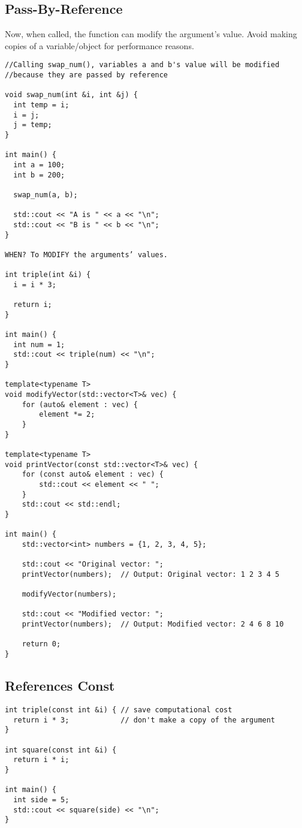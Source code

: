 \documentclass[openany]{report}
\begin{document}
\subsection{Pass-By-Reference}

Now, when called, the function can modify the argument's value.
Avoid making copies of a variable/object for performance reasons.

\begin{verbatim}
//Calling swap_num(), variables a and b's value will be modified
//because they are passed by reference

void swap_num(int &i, int &j) {
  int temp = i;
  i = j;
  j = temp;
}
 
int main() {
  int a = 100;
  int b = 200;
 
  swap_num(a, b);
 
  std::cout << "A is " << a << "\n";
  std::cout << "B is " << b << "\n";
}

WHEN? To MODIFY the arguments’ values.

int triple(int &i) {
  i = i * 3;
  
  return i;
}

int main() {
  int num = 1;
  std::cout << triple(num) << "\n";
}

template<typename T>
void modifyVector(std::vector<T>& vec) {
    for (auto& element : vec) {
        element *= 2;
    }
}

template<typename T>
void printVector(const std::vector<T>& vec) {
    for (const auto& element : vec) {
        std::cout << element << " ";
    }
    std::cout << std::endl;
}

int main() {
    std::vector<int> numbers = {1, 2, 3, 4, 5};

    std::cout << "Original vector: ";
    printVector(numbers);  // Output: Original vector: 1 2 3 4 5

    modifyVector(numbers);

    std::cout << "Modified vector: ";
    printVector(numbers);  // Output: Modified vector: 2 4 6 8 10

    return 0;
}
\end{verbatim}

\subsection{References Const}

\begin{verbatim}
int triple(const int &i) { // save computational cost
  return i * 3;            // don't make a copy of the argument
}

int square(const int &i) {
  return i * i;
}

int main() {
  int side = 5;
  std::cout << square(side) << "\n";
}
\end{verbatim}
\end{document}
